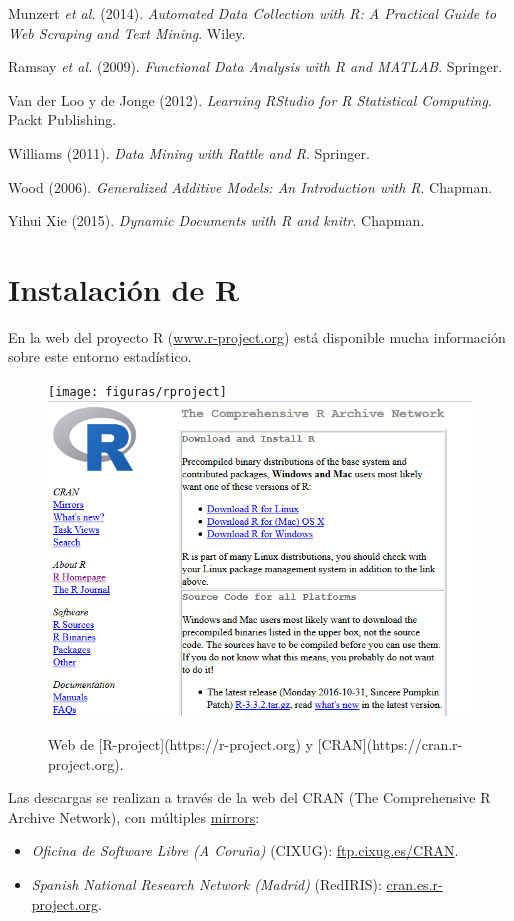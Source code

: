 \documentclass[
]{book}
\providecommand{\tightlist}{%
  \setlength{\itemsep}{0pt}\setlength{\parskip}{0pt}}
\theoremstyle{break}
\theoremstyle{nonumberplain}
\begin{document}
Munzert \emph{et al.} (2014). \emph{Automated Data Collection with R:
A Practical Guide to Web Scraping and Text Mining}. Wiley.

Ramsay \emph{et al.} (2009). \emph{Functional Data Analysis with R and MATLAB}.
Springer.

Van der Loo y de Jonge (2012). \emph{Learning RStudio for R Statistical
Computing}. Packt Publishing.

Williams (2011). \emph{Data Mining with Rattle and R}. Springer.

Wood (2006). \emph{Generalized Additive Models: An Introduction with R}. Chapman.

Yihui Xie (2015). \emph{Dynamic Documents with R and knitr}. Chapman.

\hypertarget{appendix-apendices}{%
\appendix}


\hypertarget{instalacion}{%
\chapter{Instalación de R}\label{instalacion}}

En la web del proyecto R (\href{http://www.r-project.org}{www.r-project.org}) está disponible mucha información sobre este entorno estadístico.

\begin{figure}[!htb]

{\centering \texttt{[image: figuras/rproject]} \includegraphics[width=0.45\linewidth]{figuras/cran} 

}

\caption{Web de [R-project](https://r-project.org) y [CRAN](https://cran.r-project.org).}\label{fig:rproject}
\end{figure}

Las descargas se realizan a través de la web del CRAN (The Comprehensive R Archive Network), con múltiples \href{https://cran.r-project.org/mirrors.html}{mirrors}:

\begin{itemize}
\tightlist
\item
  \emph{Oficina de Software Libre (A Coruña)} (CIXUG): \href{http://ftp.cixug.es/CRAN/}{ftp.cixug.es/CRAN}.
\item
  \emph{Spanish National Research Network (Madrid)} (RedIRIS): \href{http://cran.es.r-project.org/}{cran.es.r-project.org}.
\end{itemize}
\end{document}
